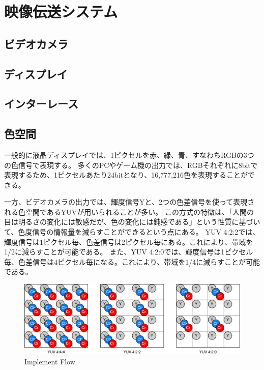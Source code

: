 \chapter{映像伝送システム}
\label{chap:video-transmission}

\section{ビデオカメラ}



\section{ディスプレイ}



\section{インターレース}



\section{色空間}

一般的に液晶ディスプレイでは、1ピクセルを赤、緑、青、すなわちRGBの3つの色信号で表現する。
多くのPCやゲーム機の出力では、RGBそれぞれに8bitで表現するため、1ピクセルあたり24bitとなり、16,777,216色を表現することができる。

一方、ビデオカメラの出力では、輝度信号Yと、2つの色差信号を使って表現される色空間であるYUVが用いられることが多い。
この方式の特徴は、「人間の目は明るさの変化には敏感だが、色の変化には鈍感である」という性質に基づいて、色度信号の情報量を減らすことができるという点にある。
YUV 4:2:2では、輝度信号は1ピクセル毎、色差信号は2ピクセル毎にある。これにより、帯域を1/2に減らすことが可能である。
また、YUV 4:2:0では、輝度信号は1ピクセル毎、色差信号は4ピクセル毎になる。これにより、帯域を1/4に減らすことが可能である。

\begin{figure}[htbp]
    \begin{center}
        \includegraphics[bb=0 0 681 222,width=15.5cm]{img/yuv-pixel-structure.pdf}
    \end{center}
    \caption{Implement Flow}
    \label{fig:yuv-pixel-structure}
\end{figure}

